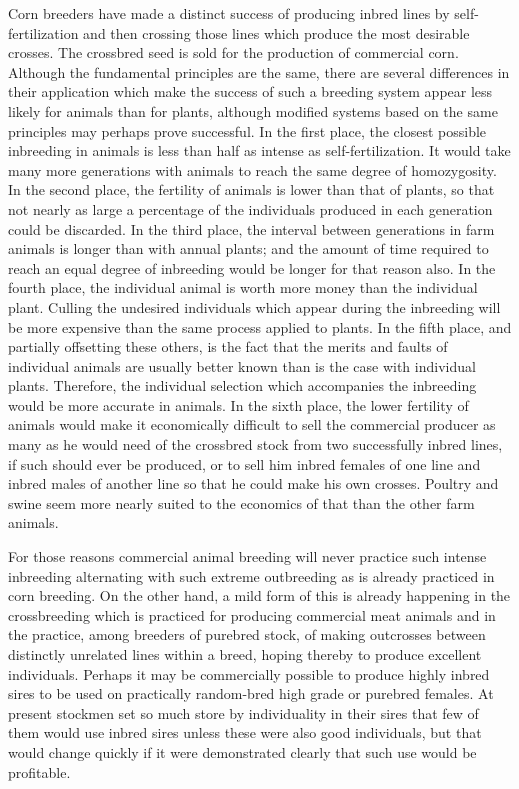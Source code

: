 Corn breeders have made a distinct success of producing inbred
lines by self-fertilization and then crossing those lines which produce
the most desirable crosses. The crossbred seed is sold for the production
of commercial corn. Although the fundamental principles are the
same, there are several differences in their application which make the
success of such a breeding system appear less likely for animals than for
plants, although modified systems based on the same principles may
perhaps prove successful. In the first place, the closest possible inbreeding
in animals is less than half as intense as self-fertilization. It would
take many more generations with animals to reach the same degree of
homozygosity. In the second place, the fertility of animals is lower than
that of plants, so that not nearly as large a percentage of the individuals
produced in each generation could be discarded. In the third place,
the interval between generations in farm animals is longer than with
annual plants; and the amount of time required to reach an equal
degree of inbreeding would be longer for that reason also. In the fourth
place, the individual animal is worth more money than the individual
plant. Culling the undesired individuals which appear during the
inbreeding will be more expensive than the same process applied to
plants. In the fifth place, and partially offsetting these others, is the fact
that the merits and faults of individual animals are usually better
known than is the case with individual plants. Therefore, the individual
selection which accompanies the inbreeding would be more
accurate in animals. In the sixth place, the lower fertility of animals
would make it economically difficult to sell the commercial producer as
many as he would need of the crossbred stock from two successfully
inbred lines, if such should ever be produced, or to sell him inbred
females of one line and inbred males of another line so that he could
make his own crosses. Poultry and swine seem more nearly suited to the
economics of that than the other farm animals.

For those reasons commercial animal breeding will never practice
such intense inbreeding alternating with such extreme outbreeding as
is already practiced in corn breeding. On the other hand, a mild form
of this is already happening in the crossbreeding which is practiced for
producing commercial meat animals and in the practice, among breeders
of purebred stock, of making outcrosses between distinctly unrelated
lines within a breed, hoping thereby to produce excellent individuals.
Perhaps it may be commercially possible to produce highly inbred sires
to be used on practically random-bred high grade or purebred females.
At present stockmen set so much store by individuality in their sires
that few of them would use inbred sires unless these were also good
individuals, but that would change quickly if it were demonstrated
clearly that such use would be profitable.

